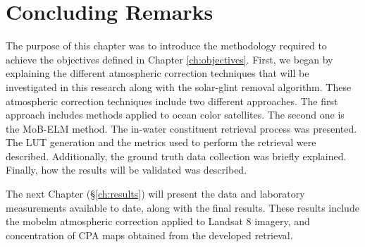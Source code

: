 \section{Concluding Remarks}
The purpose of this chapter was to introduce the methodology required to achieve the objectives defined in Chapter \ref{ch:objectives}. First, we began by explaining the different atmospheric correction techniques that will be investigated in this research along with the solar-glint removal algorithm. These atmospheric correction techniques include two different approaches. The first approach includes methods applied to ocean color satellites. The second one is the MoB-ELM method. The in-water constituent retrieval process was presented. The LUT generation and the metrics used to perform the retrieval were described. Additionally, the ground truth data collection was briefly explained. Finally, how the results will be validated was described. 

The next Chapter (\S\ref{ch:results}) will present the data and laboratory measurements available to date, along with the final results. These results include the \gls{mobelm} atmospheric correction applied to Landsat 8 imagery, and concentration of CPA maps obtained from the developed retrieval.
